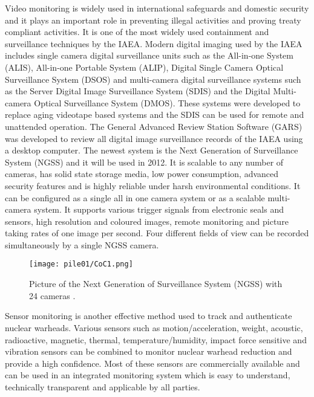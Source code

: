 \documentclass[twocolumn,a4paper]{article}
\begin{document}
Video monitoring is widely used in international safeguards and
domestic security and it plays an important role in preventing illegal
activities and proving treaty compliant activities. It is one of the
most widely used containment and surveillance techniques by the
IAEA. \citep{wuwen2004} Modern digital imaging used by the IAEA
includes single camera digital surveillance units such as the
All-in-one System (ALIS), All-in-one Portable System (ALIP), Digital
Single Camera Optical Surveillance System (DSOS) and multi-camera
digital surveillance systems such as the Server Digital Image
Surveillance System (SDIS) and the Digital Multi-camera Optical
Surveillance System (DMOS). These systems were developed to replace
aging videotape based systems and the SDIS can be used for remote and
unattended operation. The General Advanced Review Station Software
(GARS) was developed to review all digital image surveillance records
of the IAEA using a desktop computer. \citep{equipmentIAEAinspectors2002} The newest system is the
Next Generation of Surveillance System (NGSS) and it will be used in
2012. It is scalable to any number of cameras, has solid state storage
media, low power consumption, advanced security features and is highly
reliable under harsh environmental conditions. It can be configured as
a single all in one camera system or as a scalable multi-camera
system. It supports various trigger signals from electronic seals and
sensors, high resolution and coloured images, remote monitoring and
picture taking rates of one image per second. Four different fields of
view can be recorded simultaneously by a single NGSS camera. \citep{IAEAsafeguards2011}

\begin{figure}
  \texttt{[image: pile01/CoC1.png]}
  \caption{Picture of the Next Generation of Surveillance System
    (NGSS) with 24 cameras \citep{IAEAsafeguards2011}.}
\end{figure}

Sensor monitoring is another effective method used to track and
authenticate nuclear warheads.  Various sensors such as
motion/acceleration, weight, acoustic, radioactive, magnetic, thermal,
temperature/humidity, impact force sensitive and vibration sensors can
be combined to monitor nuclear warhead reduction and provide a high
confidence. Most of these sensors are commercially available and can
be used in an integrated monitoring system which is easy to
understand, technically transparent and applicable by all
parties. \citep{wuwen2004}
\end{document}
